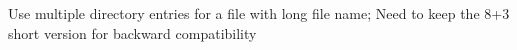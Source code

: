 \documentclass[8pt,twocolumn]{article}
\begin{document}
Use multiple directory entries for a file with long file name; 
Need to keep the 8+3 short version for backward compatibility
\noindent{}
\end{document}
